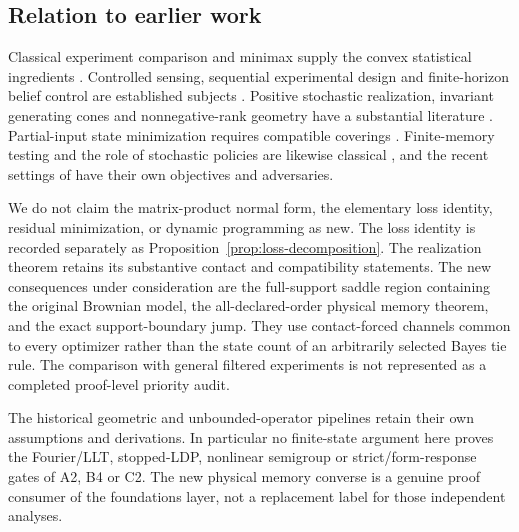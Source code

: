 \subsection{Relation to earlier work}
Classical experiment comparison and minimax supply the convex
statistical ingredients \cite{Blackwell,Sion}. Controlled sensing,
sequential experimental design and finite-horizon belief control are
established subjects \cite{Chernoff,SmallwoodSondik,NJ,NAV}.
Positive stochastic realization, invariant generating cones and
nonnegative-rank geometry have a substantial literature
\cite{Heller,Vidyasagar,GG}. Partial-input state minimization requires
compatible coverings \cite{Reusch}. Finite-memory testing and the
role of stochastic policies are likewise classical
\cite{HC,HCrandom,FH,CFH}, and the recent settings of
\cite{MP,ZSV} have their own objectives and adversaries.

We do not claim the matrix-product normal form, the elementary loss
identity, residual minimization, or dynamic programming as new.
The loss identity is recorded separately as
Proposition~\ref{prop:loss-decomposition}. The realization theorem
retains its substantive contact and compatibility statements.
The new consequences under consideration are the full-support saddle
region containing the original Brownian model, the all-declared-order
physical memory theorem, and the exact support-boundary jump.
They use contact-forced channels common to every optimizer rather than
the state count of an arbitrarily selected Bayes tie rule.
The comparison with general filtered experiments \cite{Norberg} is
not represented as a completed proof-level priority audit.

The historical geometric and unbounded-operator pipelines retain their
own assumptions and derivations. In particular no finite-state argument
here proves the Fourier/LLT, stopped-LDP, nonlinear semigroup or
strict/form-response gates of A2, B4 or C2. The new physical memory
converse is a genuine proof consumer of the foundations layer, not a
replacement label for those independent analyses.
